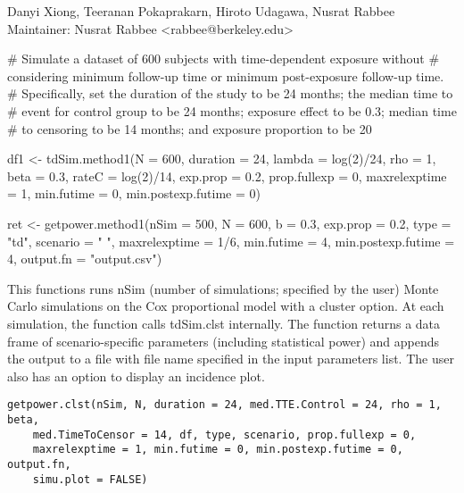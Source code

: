 \documentclass[a4paper]{book}
\begin{document}
%
\begin{Author}\relax
Danyi Xiong, Teeranan Pokaprakarn, Hiroto Udagawa, Nusrat Rabbee \\{}
Maintainer: Nusrat Rabbee <rabbee@berkeley.edu>
\end{Author}
%
\begin{Examples}
\begin{ExampleCode}
# Simulate a dataset of 600 subjects with time-dependent exposure without
# considering minimum follow-up time or minimum post-exposure follow-up time.
# Specifically, set the duration of the study to be 24 months; the median time to
# event for control group to be 24 months; exposure effect to be 0.3; median time
# to censoring to be 14 months; and exposure proportion to be 20%

df1 <- tdSim.method1(N = 600, duration = 24, lambda = log(2)/24, rho = 1, 
   beta = 0.3, rateC = log(2)/14, exp.prop = 0.2, 
   prop.fullexp  = 0, maxrelexptime = 1, min.futime = 0,
   min.postexp.futime = 0)
   
ret <- getpower.method1(nSim = 500, N = 600, b = 0.3, exp.prop = 0.2, 
	type = "td", scenario = " ", maxrelexptime = 1/6, min.futime = 4,
	 min.postexp.futime = 4, output.fn = "output.csv")

\end{ExampleCode}
\end{Examples}
%
\begin{Description}\relax
This functions runs nSim (number of simulations; specified by the user) Monte Carlo simulations on the Cox proportional model with a cluster option. At each simulation, the function calls tdSim.clst internally. The function returns a data frame of scenario-specific parameters (including statistical power) and appends the output to a file with file name specified in the input parameters list. The user also has an option to display an incidence plot.
\end{Description}
%
\begin{Usage}
\begin{verbatim}
getpower.clst(nSim, N, duration = 24, med.TTE.Control = 24, rho = 1, beta,
    med.TimeToCensor = 14, df, type, scenario, prop.fullexp = 0,
    maxrelexptime = 1, min.futime = 0, min.postexp.futime = 0, output.fn,
    simu.plot = FALSE)
\end{verbatim}
\end{Usage}
\end{document}

